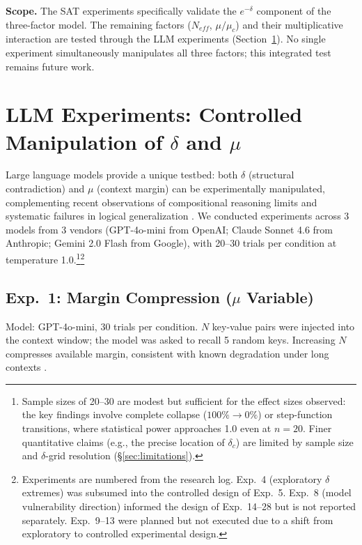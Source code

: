 \documentclass[11pt,a4paper]{article}
\begin{document}
\noindent\textbf{Scope.} The SAT experiments specifically validate the $e^{-\delta}$ component of the three-factor model. The remaining factors ($N_{eff}$, $\mu/\mu_c$) and their multiplicative interaction are tested through the LLM experiments (Section~\ref{sec:llm}). No single experiment simultaneously manipulates all three factors; this integrated test remains future work.

\section{LLM Experiments: Controlled Manipulation of \texorpdfstring{$\delta$}{δ} and \texorpdfstring{$\mu$}{μ}}
\label{sec:llm}

Large language models provide a unique testbed: both $\delta$ (structural contradiction) and $\mu$ (context margin) can be experimentally manipulated, complementing recent observations of compositional reasoning limits \citep{dziri2023,wei2022} and systematic failures in logical generalization \citep{berglund2023}. We conducted experiments across 3 models from 3 vendors (GPT-4o-mini from OpenAI; Claude Sonnet 4.6 from Anthropic; Gemini 2.0 Flash from Google), with 20--30 trials per condition at temperature 1.0.\footnote{Sample sizes of 20--30 are modest but sufficient for the effect sizes observed: the key findings involve complete collapse ($100\% \to 0\%$) or step-function transitions, where statistical power approaches 1.0 even at $n = 20$. Finer quantitative claims (e.g., the precise location of $\delta_c$) are limited by sample size and $\delta$-grid resolution (\S\ref{sec:limitations}).}\footnote{Experiments are numbered from the research log. Exp.~4 (exploratory $\delta$ extremes) was subsumed into the controlled design of Exp.~5. Exp.~8 (model vulnerability direction) informed the design of Exp.~14--28 but is not reported separately. Exp.~9--13 were planned but not executed due to a shift from exploratory to controlled experimental design.}

\subsection{Exp.~1: Margin Compression (\texorpdfstring{$\mu$}{μ} Variable)}

Model: GPT-4o-mini, 30 trials per condition. $N$ key-value pairs were injected into the context window; the model was asked to recall 5 random keys. Increasing $N$ compresses available margin, consistent with known degradation under long contexts \citep{liu2024}.
\end{document}
